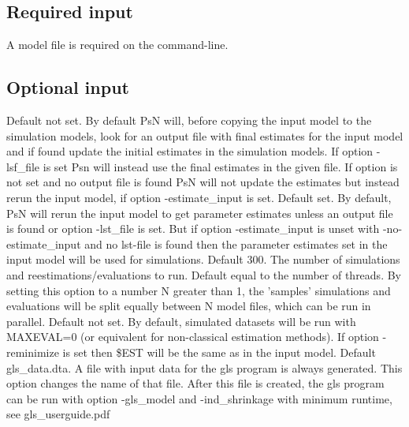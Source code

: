 \subsection{Required input}

A model file is required on the command-line.

\subsection{Optional input}

\begin{optionlist}
Default not set. By default PsN will, before copying the input model to the simulation models, look for an output file with final estimates for the input model and if found update the initial estimates in the simulation models. If option -lsf\_file is set Psn will instead use the final estimates in the given file. If option is not set and no output file is found PsN will not update the estimates but instead rerun the input model, if option -estimate\_input is set. 
\nextopt
{}
Default set. By default, PsN will rerun the input model to get parameter estimates unless an output file is found or option -lst\_file is set. But if option -estimate\_input is unset with -no-estimate\_input and no lst-file is found then the parameter estimates set in the input model will be used for simulations. 
\nextopt
{}
Default 300. The number of simulations and reestimations/evaluations to run. 
\nextopt
{}
Default equal to the number of threads.
By setting this option to a number N greater than 1, the 'samples' simulations and evaluations
will be split equally between N model files, which can be run in parallel.
\nextopt
{}
Default not set. By default, simulated datasets will be run with MAXEVAL=0 (or equivalent for non-classical estimation methods). If option -reminimize is set then \$EST will be the same as in the input model. 
\nextopt
{}
Default gls\_data.dta. A file with input data for the gls program is always generated. This option changes the name of that file. After this file is created, the gls program can be run with option \mbox{-gls\_model} and -ind\_shrinkage with minimum runtime, see gls\_userguide.pdf 
\nextopt
\end{optionlist}

